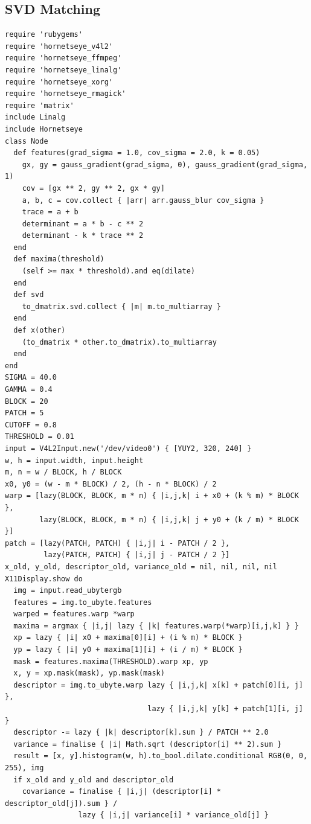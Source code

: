 \documentclass[12pt,a4paper,oneside,openright]{book}
\begin{document}
\begin{CJK}{UTF8}{}
\subsection{\acs{SVD} Matching}\label{cha:svdsource}
\begin{lstlisting}
require 'rubygems'
require 'hornetseye_v4l2'
require 'hornetseye_ffmpeg'
require 'hornetseye_linalg'
require 'hornetseye_xorg'
require 'hornetseye_rmagick'
require 'matrix'
include Linalg
include Hornetseye
class Node
  def features(grad_sigma = 1.0, cov_sigma = 2.0, k = 0.05)
    gx, gy = gauss_gradient(grad_sigma, 0), gauss_gradient(grad_sigma, 1)
    cov = [gx ** 2, gy ** 2, gx * gy]
    a, b, c = cov.collect { |arr| arr.gauss_blur cov_sigma }
    trace = a + b
    determinant = a * b - c ** 2
    determinant - k * trace ** 2
  end
  def maxima(threshold)
    (self >= max * threshold).and eq(dilate)
  end
  def svd
    to_dmatrix.svd.collect { |m| m.to_multiarray }
  end
  def x(other)
    (to_dmatrix * other.to_dmatrix).to_multiarray
  end
end
SIGMA = 40.0
GAMMA = 0.4
BLOCK = 20
PATCH = 5
CUTOFF = 0.8
THRESHOLD = 0.01
input = V4L2Input.new('/dev/video0') { [YUY2, 320, 240] }
w, h = input.width, input.height
m, n = w / BLOCK, h / BLOCK
x0, y0 = (w - m * BLOCK) / 2, (h - n * BLOCK) / 2
warp = [lazy(BLOCK, BLOCK, m * n) { |i,j,k| i + x0 + (k % m) * BLOCK },
        lazy(BLOCK, BLOCK, m * n) { |i,j,k| j + y0 + (k / m) * BLOCK }]
patch = [lazy(PATCH, PATCH) { |i,j| i - PATCH / 2 },
         lazy(PATCH, PATCH) { |i,j| j - PATCH / 2 }]
x_old, y_old, descriptor_old, variance_old = nil, nil, nil, nil
X11Display.show do
  img = input.read_ubytergb
  features = img.to_ubyte.features
  warped = features.warp *warp
  maxima = argmax { |i,j| lazy { |k| features.warp(*warp)[i,j,k] } }
  xp = lazy { |i| x0 + maxima[0][i] + (i % m) * BLOCK }
  yp = lazy { |i| y0 + maxima[1][i] + (i / m) * BLOCK }
  mask = features.maxima(THRESHOLD).warp xp, yp
  x, y = xp.mask(mask), yp.mask(mask)
  descriptor = img.to_ubyte.warp lazy { |i,j,k| x[k] + patch[0][i, j] },
                                 lazy { |i,j,k| y[k] + patch[1][i, j] }
  descriptor -= lazy { |k| descriptor[k].sum } / PATCH ** 2.0
  variance = finalise { |i| Math.sqrt (descriptor[i] ** 2).sum }
  result = [x, y].histogram(w, h).to_bool.dilate.conditional RGB(0, 0, 255), img
  if x_old and y_old and descriptor_old
    covariance = finalise { |i,j| (descriptor[i] * descriptor_old[j]).sum } /
                 lazy { |i,j| variance[i] * variance_old[j] }

\end{lstlisting}
\end{CJK}
\end{document}
